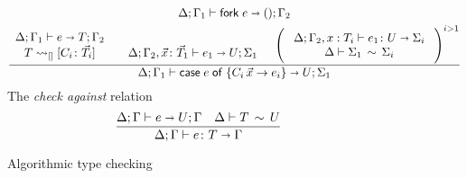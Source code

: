 \begin{figure}[h!]
\begin{gather*}
{  }{
    \algtypeout[\kindEnv;\varEnv_1]{\forke{e}}{\unite}{\varEnv_2}
  }
  \\
  \frac{
    \begin{array}{c}
      \algtypeout[\kindEnv;\varEnv_1]{e}{T}{\varEnv_2}\\
      T \Extract{[]}[C_i\colon\vec T_i]\\
    \end{array}
    \quad
    \begin{array}{c}\\
      \algtypeout[\kindEnv;\varEnv_2, \vec x\colon\vec T_1]{e_1}{U}{\Sigma_1}
    \end{array}
    \quad
    \Bigg(\;\begin{array}{c}
              \algtypein[\kindEnv;\varEnv_2,x:T_i]{e_1}{U}{\Sigma_i}\\
              \ctxequiv{\Sigma_1}{\Sigma_i} 
            \end{array}
            \;\Bigg)^{i>1}
          }{
            \algtypeout[\kindEnv;\varEnv_1]{\casee{e}{\{C_i\,\vec x\rightarrow e_i\}}}{U}{\Sigma_1}
          }
  \end{gather*}
  The \emph{check against} relation\hfill{}
  \begin{gather*}
    \frac{
      \algtypeout e U \varEnv
      \quad
      \typeequiv T U
    }{
      \algtypein e T \varEnv
    }
  \end{gather*}
  \caption{Algorithmic type checking}
  \label{fig:alg-typing}
\end{figure}

